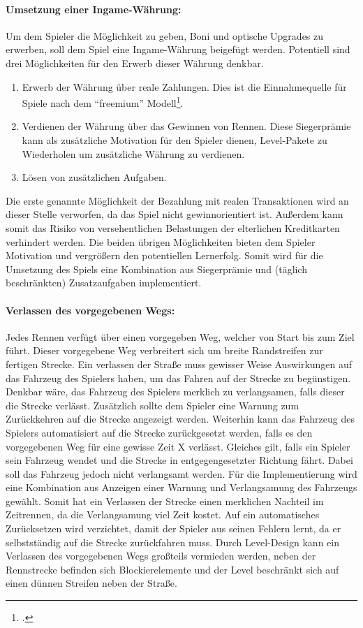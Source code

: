 		\paragraph{Umsetzung einer Ingame-Währung:}
		Um dem Spieler die Möglichkeit zu geben, Boni und optische Upgrades zu erwerben, soll dem Spiel eine Ingame-Währung beigefügt werden. Potentiell sind drei Möglichkeiten für den Erwerb dieser Währung denkbar.
		\begin{enumerate}
			\item{ Erwerb der Währung über reale Zahlungen. Dies ist die Einnahmequelle für Spiele nach dem \enquote{freemium} Modell\footcite[Seite 8]{freemium}. }
			\item{ Verdienen der Währung über das Gewinnen von Rennen. Diese Siegerprämie kann als zusätzliche Motivation für den Spieler dienen, Level-Pakete zu Wiederholen um zusätzliche Währung zu verdienen. }
			\item{ Lösen von zusätzlichen Aufgaben. }
		\end{enumerate}
		Die erste genannte Möglichkeit der Bezahlung mit realen Transaktionen wird an dieser Stelle verworfen, da das Spiel nicht gewinnorientiert ist. Außerdem kann somit das Risiko von versehentlichen Belastungen der elterlichen Kreditkarten verhindert werden.
		Die beiden übrigen Möglichkeiten bieten dem Spieler Motivation und vergrößern den potentiellen Lernerfolg. Somit wird für die Umsetzung des Spiels eine Kombination aus Siegerprämie und (täglich beschränkten) Zusatzaufgaben implementiert.

		\paragraph{Verlassen des vorgegebenen Wegs:}
		Jedes Rennen verfügt über einen vorgegeben Weg, welcher von Start bis zum Ziel führt. Dieser vorgegebene Weg verbreitert sich um breite Randstreifen zur fertigen Strecke. Ein verlassen der Straße muss gewisser Weise Auswirkungen auf das Fahrzeug des Spielers haben, um das Fahren auf der Strecke zu begünstigen. Denkbar wäre, das Fahrzeug des Spielers merklich zu verlangsamen, falls dieser die Strecke verlässt. Zusätzlich sollte dem Spieler eine Warnung zum Zurückkehren auf die Strecke angezeigt werden. Weiterhin kann das Fahrzeug des Spielers automatisiert auf die Strecke zurückgesetzt werden, falls es den vorgegebenen Weg für eine gewisse Zeit X verlässt. Gleiches gilt, falls ein Spieler sein Fahrzeug wendet und die Strecke in entgegengesetzter Richtung fährt. Dabei soll das Fahrzeug jedoch nicht verlangsamt werden. Für die Implementierung wird eine Kombination aus Anzeigen einer Warnung und Verlangsamung des Fahrzeugs gewählt.
		Somit hat ein Verlassen der Strecke einen merklichen Nachteil im Zeitrennen, da die Verlangsamung viel Zeit kostet. Auf ein automatisches Zurücksetzen wird verzichtet, damit der Spieler aus seinen Fehlern lernt, da er selbstständig auf die Strecke zurückfahren muss. Durch Level-Design kann ein Verlassen des vorgegebenen Wegs großteils vermieden werden, neben der Rennstrecke befinden sich Blockierelemente und der Level beschränkt sich auf einen dünnen Streifen neben der Straße.

